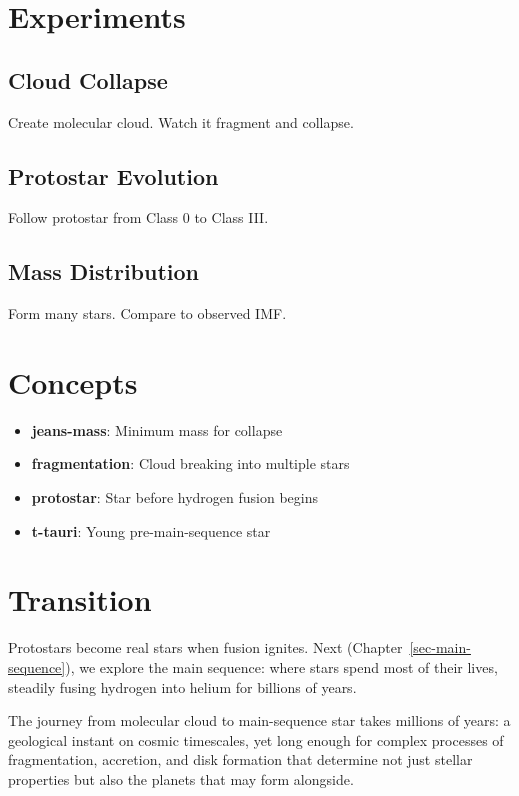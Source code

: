 \documentclass[
  11pt,
  letterpaper,
  twoside,
  openright]{book}
\providecommand{\tightlist}{%
  \setlength{\itemsep}{0pt}\setlength{\parskip}{0pt}}
\begin{document}
\section{Experiments}\label{experiments-19}

\subsection{Cloud Collapse}\label{cloud-collapse}

Create molecular cloud. Watch it fragment and collapse.

\subsection{Protostar Evolution}\label{protostar-evolution}

Follow protostar from Class 0 to Class III.

\subsection{Mass Distribution}\label{mass-distribution}

Form many stars. Compare to observed IMF.

\section{Concepts}\label{concepts-19}

\begin{itemize}
\tightlist
\item
  \textbf{jeans-mass}: Minimum mass for collapse
\item
  \textbf{fragmentation}: Cloud breaking into multiple stars
\item
  \textbf{protostar}: Star before hydrogen fusion begins
\item
  \textbf{t-tauri}: Young pre-main-sequence star
\end{itemize}

\section{Transition}\label{transition-19}

Protostars become real stars when fusion ignites. Next
(Chapter~\ref{sec-main-sequence}), we explore the main sequence: where
stars spend most of their lives, steadily fusing hydrogen into helium
for billions of years.

The journey from molecular cloud to main-sequence star takes millions of
years: a geological instant on cosmic timescales, yet long enough for
complex processes of fragmentation, accretion, and disk formation that
determine not just stellar properties but also the planets that may form
alongside.
\end{document}
